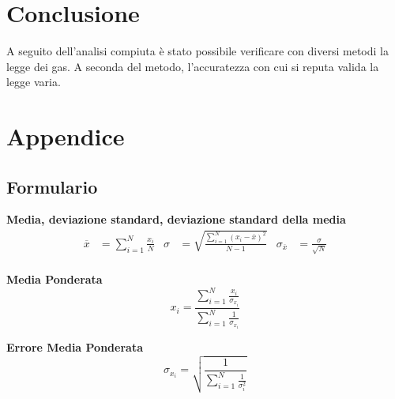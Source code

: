 \documentclass[a4paper,11pt,oneside]{article}
\begin{document}
\section{Conclusione}
A seguito dell'analisi compiuta è stato possibile verificare con diversi metodi la legge dei gas. A seconda del metodo, l'accuratezza con cui si reputa valida la legge varia.






\newpage
\section{Appendice}
\subsection{Formulario}
\textbf{Media, deviazione standard, deviazione standard della media}
\begin{align*}
        \overline{x}&=\sum\limits_{i=1}^{N} \frac{x_{i}}{N}&
        \sigma&=\sqrt{\frac{\sum\limits_{i=1}^{N} (x_{i}-\overline{x})^2}{N-1}}&
        \sigma_{\overline{x}}&=\frac{\sigma}{\sqrt{N}}
\end{align*}\\

\textbf{Media Ponderata}
\begin{equation*}
\label{eq:media_pond}
    x_i=\frac{\sum_{i=1}^{N}\frac{x_i}{\sigma_{x_i}}}{\sum_{i=1}^{N}\frac{1}{\sigma_{x_i}}}
\end{equation*}

\textbf{Errore Media Ponderata}
\begin{equation*}
\label{eq:errore_media_pond}
     \sigma_{x_i}=\sqrt{\frac{1}{\sum_{i=1}^{N}\frac{1}{\sigma_{i}^{2}}}}
\end{equation*}
\end{document}
